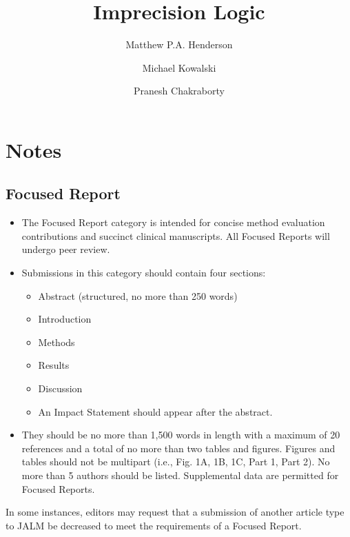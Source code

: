 \documentclass[review]{elsarticle}
\date{}
\title{}
\begin{document}
\makeatletter
\newcommand{\citeprocitem}[2]{\hyper@linkstart{cite}{citeproc_bib_item_#1}#2\hyper@linkend}
\makeatother



\begin{frontmatter}
\title{Imprecision Logic}
\author[NSO, UoO]{Matthew P.A. Henderson}
\author[NSO]{Michael Kowalski}
\author[NSO, UO]{Pranesh Chakraborty}
\address[NSO]{Newborn Screening Ontario, Children's Hospital of Eastern Ontario,Canada}
\address[UoO]{Department of Medicine, University of Ottawa,Canada} 
\end{frontmatter}

\section*{Notes}
\label{sec:orga9f55b9}
\subsection*{Focused Report}
\label{sec:org1092d71}
\begin{itemize}
\item The Focused Report category is intended for concise method
evaluation contributions and succinct clinical manuscripts. All
Focused Reports will undergo peer review.
\item Submissions in this category should contain four sections:
\begin{itemize}
\item Abstract (structured, no more than 250 words)
\item Introduction
\item Methods
\item Results
\item Discussion
\item An Impact Statement should appear after the abstract.
\end{itemize}
\item They should be no more than 1,500 words in length with a maximum of
20 references and a total of no more than two tables and
figures. Figures and tables should not be multipart (i.e., Fig. 1A,
1B, 1C, Part 1, Part 2). No more than 5 authors should be
listed. Supplemental data are permitted for Focused Reports.
\end{itemize}

In some instances, editors may request that a submission of another article type to JALM be decreased to meet the requirements of a Focused Report.
\end{document}
